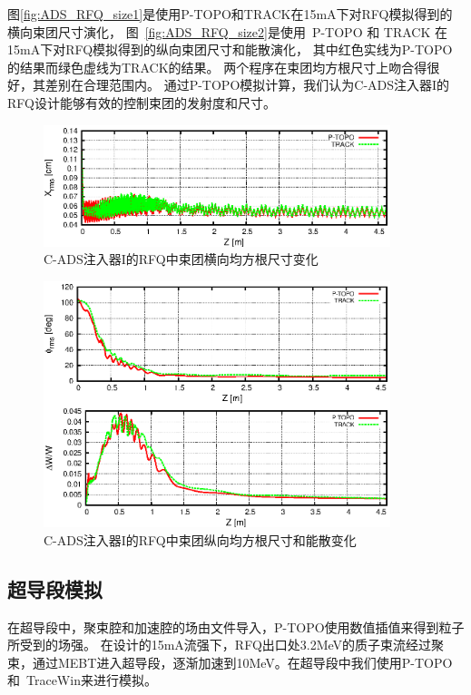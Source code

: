 图\eqref{fig:ADS_RFQ_size1}是使用P-TOPO和TRACK在15mA下对RFQ模拟得到的横向束团尺寸演化，
图~\eqref{fig:ADS_RFQ_size2}是使用~P-TOPO 和 TRACK 在15mA下对RFQ模拟得到的纵向束团尺寸和能散演化，
其中红色实线为P-TOPO的结果而绿色虚线为TRACK的结果。
两个程序在束团均方根尺寸上吻合得很好，其差别在合理范围内。
通过P-TOPO模拟计算，我们认为C-ADS注入器I的RFQ设计能够有效的控制束团的发射度和尺寸。

\begin{figure}[!tbh]
    \centering
    \includegraphics[width=0.9\textwidth]{Img/ADS_RFQ_size1.eps}
    \caption{C-ADS注入器I的RFQ中束团横向均方根尺寸变化}
    \label{fig:ADS_RFQ_size1}
\end{figure}

\begin{figure}[!tbh]
    \centering
    \includegraphics[width=0.9\textwidth]{Img/ADS_RFQ_size2.eps}
    \caption{C-ADS注入器I的RFQ中束团纵向均方根尺寸和能散变化}
    \label{fig:ADS_RFQ_size2}
\end{figure}

\subsection{超导段模拟}  \label{section:ADS_simulation_SC}
在超导段中，聚束腔和加速腔的场由文件导入，P-TOPO使用数值插值来得到粒子所受到的场强。
在设计的15mA流强下，RFQ出口处3.2MeV的质子束流经过聚束，通过MEBT进入超导段，逐渐加速到10MeV。在超导段中我们使用P-TOPO和~TraceWin来进行模拟。

